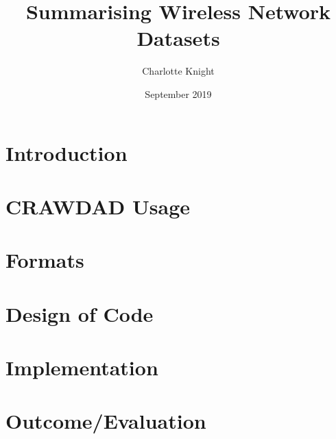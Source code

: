 \documentclass{article}
\title{Summarising Wireless Network Datasets}
\author{Charlotte Knight}
\date{September 2019}
\begin{document}
\maketitle

\newpage
\tableofcontents
\newpage

\section{Introduction}


\section{CRAWDAD Usage}


\section{Formats}


\section{Design of Code}


\section{Implementation}


\section{Outcome/Evaluation}


\newpage

\nocite{*}
\printbibliography
\end{document}
